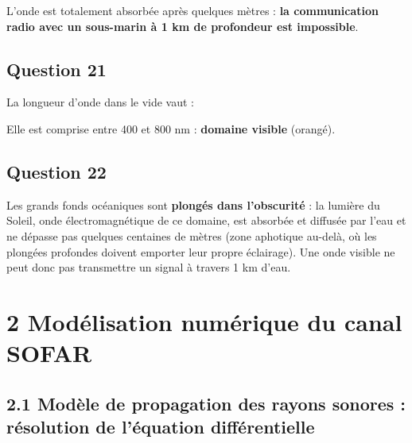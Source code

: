 \documentclass[11pt,a4paper]{article}
\newcommand{\equationajustee}[1]{%
  \sbox{\boiteequation}{$\displaystyle #1$}%
  \ifdim\wd\boiteequation>\linewidth
    \[\resizebox{\linewidth}{!}{\usebox{\boiteequation}}\]%
  \else
    \[#1\]%
  \fi}
\begin{document}
L'onde est totalement absorbée après quelques mètres : \textbf{la communication radio avec un sous-marin à 1 km de profondeur est impossible}.

\hypertarget{question-21}{%
\subsection{Question 21}\label{question-21}}

La longueur d'onde dans le vide vaut :

\equationajustee{\begin{aligned}
\lambda &= \frac{c}{f}\\
&= \frac{3 \times 10^8}{5 \times 10^{14}}\\
&= 6 \times 10^{-7}\ \mathrm{m}\\
&= 600\ \mathrm{nm}
\end{aligned}}

Elle est comprise entre 400 et 800 nm : \textbf{domaine visible} (orangé).

\hypertarget{question-22}{%
\subsection{Question 22}\label{question-22}}

Les grands fonds océaniques sont \textbf{plongés dans l'obscurité} : la lumière du Soleil, onde électromagnétique de ce domaine, est absorbée et diffusée par l'eau et ne dépasse pas quelques centaines de mètres (zone aphotique au-delà, où les plongées profondes doivent emporter leur propre éclairage). Une onde visible ne peut donc pas transmettre un signal à travers 1 km d'eau.

\hypertarget{moduxe9lisation-numuxe9rique-du-canal-sofar}{%
\section{2 Modélisation numérique du canal SOFAR}\label{moduxe9lisation-numuxe9rique-du-canal-sofar}}

\hypertarget{moduxe8le-de-propagation-des-rayons-sonores-ruxe9solution-de-luxe9quation-diffuxe9rentielle}{%
\subsection{2.1 Modèle de propagation des rayons sonores : résolution de l'équation différentielle}\label{moduxe8le-de-propagation-des-rayons-sonores-ruxe9solution-de-luxe9quation-diffuxe9rentielle}}
\end{document}
